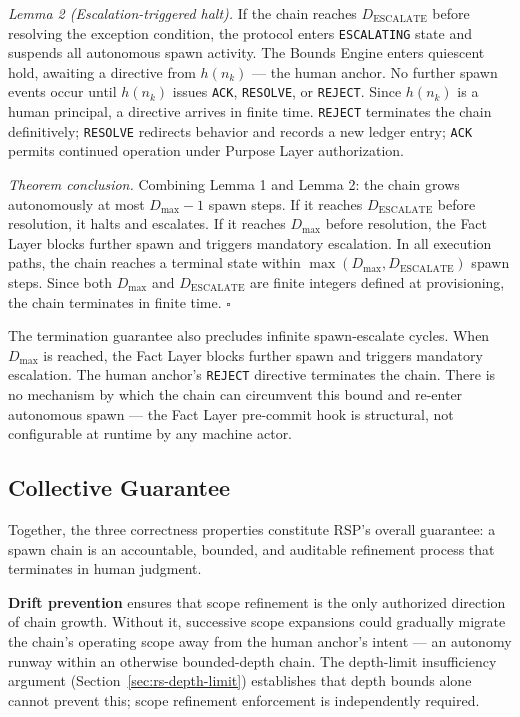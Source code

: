 \medskip\noindent\textit{Lemma 2 (Escalation-triggered halt).} If the chain reaches $D_{\mathrm{ESCALATE}}$ before resolving the exception condition, the protocol enters \texttt{ESCALATING} state and suspends all autonomous spawn activity. The Bounds Engine enters quiescent hold, awaiting a directive from $h(n_k)$ --- the human anchor. No further spawn events occur until $h(n_k)$ issues \texttt{ACK}, \texttt{RESOLVE}, or \texttt{REJECT}. Since $h(n_k)$ is a human principal, a directive arrives in finite time. \texttt{REJECT} terminates the chain definitively; \texttt{RESOLVE} redirects behavior and records a new ledger entry; \texttt{ACK} permits continued operation under Purpose Layer authorization.

\medskip\noindent\textit{Theorem conclusion.} Combining Lemma 1 and Lemma 2: the chain grows autonomously at most $D_{\max} - 1$ spawn steps. If it reaches $D_{\mathrm{ESCALATE}}$ before resolution, it halts and escalates. If it reaches $D_{\max}$ before resolution, the Fact Layer blocks further spawn and triggers mandatory escalation. In all execution paths, the chain reaches a terminal state within $\max(D_{\max}, D_{\mathrm{ESCALATE}})$ spawn steps. Since both $D_{\max}$ and $D_{\mathrm{ESCALATE}}$ are finite integers defined at provisioning, the chain terminates in finite time. $\square$

The termination guarantee also precludes infinite spawn-escalate cycles. When $D_{\max}$ is reached, the Fact Layer blocks further spawn and triggers mandatory escalation. The human anchor's \texttt{REJECT} directive terminates the chain. There is no mechanism by which the chain can circumvent this bound and re-enter autonomous spawn --- the Fact Layer pre-commit hook is structural, not configurable at runtime by any machine actor.

\subsection{Collective Guarantee}
\label{sec:rs-collective-guarantee}

Together, the three correctness properties constitute RSP's overall guarantee: a spawn chain is an accountable, bounded, and auditable refinement process that terminates in human judgment.

\medskip\textbf{Drift prevention} ensures that scope refinement is the only authorized direction of chain growth. Without it, successive scope expansions could gradually migrate the chain's operating scope away from the human anchor's intent --- an autonomy runway within an otherwise bounded-depth chain. The depth-limit insufficiency argument (Section~\ref{sec:rs-depth-limit}) establishes that depth bounds alone cannot prevent this; scope refinement enforcement is independently required.


